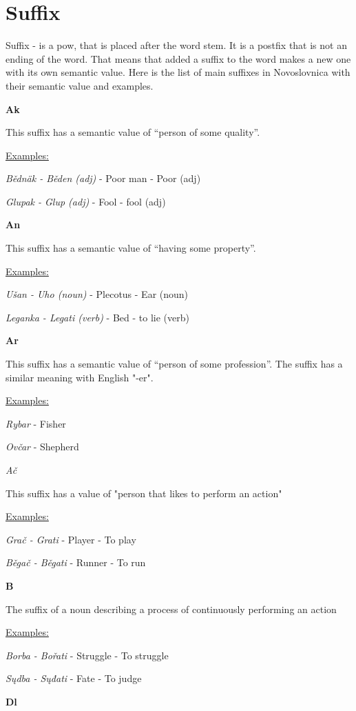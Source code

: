 \section{Suffix}

Suffix - is a \gls{pow}, that is placed after the word stem. It is a postfix that is not an ending of the word. That means that added a suffix to the word makes a new one with its own semantic value. Here is the list of main suffixes in Novoslovnica with their semantic value and examples.

\textbf{Ak}

This suffix has a semantic value of “person of some quality”.

\underline{Examples:}

\textit{Bědnäk - Běden (adj)} - Poor man - Poor (adj)

\textit{Glupak - Glup (adj)} - Fool - fool (adj)

\textbf{An}

This suffix has a semantic value of “having some property”.

\underline{Examples:}

\textit{Ušan - Uho (noun)} - Plecotus - Ear (noun)

\textit{Leganka - Legati (verb)} - Bed - to lie (verb)

\textbf{Ar}

This suffix has a semantic value of “person of some profession”. The suffix has a similar meaning with English "-er".

\underline{Examples:}

\textit{Rybar} - Fisher

\textit{Ovčar} - Shepherd

\textit{Ač}

This suffix has a value of "person that likes to perform an action"

\underline{Examples:}

\textit{Grač - Grati} - Player - To play

\textit{Běgač - Běgati} - Runner - To run

\textbf{B}

The suffix of a noun describing a process of continuously performing an action

\underline{Examples:}

\textit{Borba - Bořati} - Struggle - To struggle

\textit{Sųdba - Sųđati} - Fate - To judge

\textbf{Dl}

